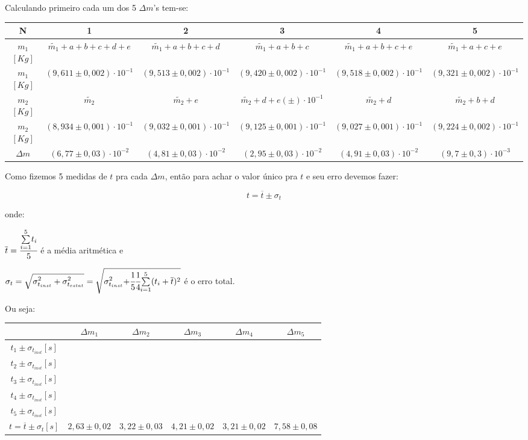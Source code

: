 \documentclass{article}
\begin{document}
Calculando primeiro cada um dos 5 $\Delta m$'s tem-se:

\begin{tabular}{|c|c|c|c|c|c|}
\hline 
N & 1 & 2 & 3 & 4 & 5\tabularnewline
\hline 
$m_{1}$$[Kg]$ & $\widetilde{m_{1}}+a+b+c+d+e$ & $\widetilde{m_{1}}+a+b+c+d$ & $\widetilde{m_{1}}+a+b+c$ & $\widetilde{m_{1}}+a+b+c+e$ & $\widetilde{m_{1}}+a+c+e$\tabularnewline
\hline 
$m_{1}$$[Kg]$ & $(9,611\pm0,002)\cdot10^{-1}$ & $(9,513\pm0,002)\cdot10^{-1}$ & $(9,420\pm0,002)\cdot10^{-1}$ & $(9,518\pm0,002)\cdot10^{-1}$ & $(9,321\pm0,002)\cdot10^{-1}$\tabularnewline
\hline 
$m_{2}$$[Kg]$  & $\widetilde{m_{2}}$ & $\widetilde{m_{2}}+e$ & $\widetilde{m_{2}}+d+e$$(\pm)\cdot10^{-1}$ & $\widetilde{m_{2}}+d$ & $\widetilde{m_{2}}+b+d$\tabularnewline
\hline 
$m_{2}$$[Kg]$ & $(8,934\pm0,001)\cdot10^{-1}$ & $(9,032\pm0,001)\cdot10^{-1}$ & $(9,125\pm0,001)\cdot10^{-1}$ & $(9,027\pm0,001)\cdot10^{-1}$ & $(9,224\pm0,002)\cdot10^{-1}$\tabularnewline
\hline 
$\Delta m$ & $(6,77\pm0,03)\cdot10^{-2}$ & $(4,81\pm0,03)\cdot10^{-2}$ & $(2,95\pm0,03)\cdot10^{-2}$ & $(4,91\pm0,03)\cdot10^{-2}$ & $(9,7\pm0,3)\cdot10^{-3}$\tabularnewline
\hline 
\end{tabular}

Como fizemos 5 medidas de $t$ pra cada $\Delta m$, então para achar
o valor único pra $t$ e seu erro devemos fazer:

\[
t=\overline{t}\pm\sigma_{t}
\]
 

onde:

$\overline{t}=\cfrac[r]{\overset{{\scriptstyle 5}}{\underset{{\scriptstyle i=1}}{\sum}}t_{i}}{5}$
é a média aritmética e 

$\sigma_{t}=\sqrt{{\displaystyle \sigma_{t_{inst}}^{2}+\sigma_{t_{estat}}^{2}}}=\sqrt{{\displaystyle \sigma_{t_{inst}}^{2}+}\cfrac[r]{1}{5}\cfrac[l]{1}{4}\overset{{\scriptstyle 5}}{\underset{{\scriptstyle i=1}}{\sum}}(t_{i}+\overline{t})^{2}}$
é o erro total.

Ou seja:

\begin{tabular}{|c|c|c|c|c|c|}
\cline{2-6} 
\multicolumn{1}{c|}{} & $\Delta m_{1}$ & $\Delta m_{2}$ & $\Delta m_{3}$ & $\Delta m_{4}$ & $\Delta m_{5}$\tabularnewline
\hline 
$t_{1}\pm\sigma_{t_{inst}}$$[s]$ &  &  &  &  & \tabularnewline
\hline 
$t_{2}\pm\sigma_{t_{inst}}$$[s]$ &  &  &  &  & \tabularnewline
\hline 
$t_{3}\pm\sigma_{t_{inst}}$$[s]$ &  &  &  &  & \tabularnewline
\hline 
$t_{4}\pm\sigma_{t_{inst}}$$[s]$ &  &  &  &  & \tabularnewline
\hline 
$t_{5}\pm\sigma_{t_{inst}}$$[s]$ &  &  &  &  & \tabularnewline
\hline 
$t=\overline{t}\pm\sigma_{t}$$[s]$ & $2,63\pm0,02$ & $3,22\pm0,03$ & $4,21\pm0,02$ & $3,21\pm0,02$ & $7,58\pm0,08$\tabularnewline
\hline 
\end{tabular}
\end{document}
